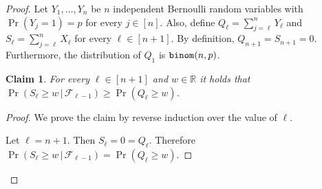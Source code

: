 \documentclass[letterpaper,11pt]{article}
\newenvironment{claimproof}{\begin{proof}\renewcommand{\qedsymbol}{$\lrcorner$}}{\end{proof}}
\newcommand{\cF}{\mathcal{F}}
\newcommand{\1}[1]{\mathds{1}\left[#1\right]}
\newcommand{\prbinom}{\textnormal{\texttt{binom}}}
\newtheorem{claim}[theorem]{Claim}
\begin{document}
\begin{proof}
Let $Y_1,\ldots, Y_n$ be $n$ independent Bernoulli  random variables with $\Pr(Y_j=1) = p$ for every $j\in[n]$. Also, define $Q_{\ell}  = \sum_{j=\ell}^n Y_{\ell}$ and $S_{\ell } = \sum_{j=\ell}^{n} X_{\ell}$ for every $\ell \in [n+1]$. By definition, $Q_{n+1}=S_{n+1}=0$.   Furthermore, the distribution of $Q_{1}$ is $\prbinom(n,p)$. 

\begin{claim}
	\label{claim:dominance}
For every $\ell \in [n+1]$ and $w\in \mathbb{R}$ it holds that $\Pr(S_{\ell}\geq w\,|\, \cF_{\ell-1}) \geq \Pr(Q_{\ell}\geq w)$. 
\end{claim}
\begin{claimproof}
We prove the claim by reverse induction over the value of $\ell$. 

 Let $\ell =n+1$. Then $S_{\ell}=0=Q_{\ell}$. Therefore $\Pr(S_{\ell}\geq w\,|\, \cF_{\ell-1}) = \Pr(Q_{\ell}\geq w)$.


\end{claimproof}
\end{proof}
\end{document}
